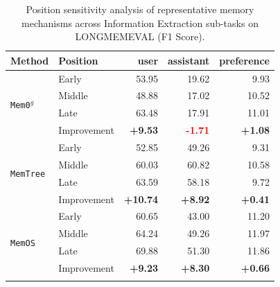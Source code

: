 


\begin{table}[t]
\centering
\caption{Position sensitivity analysis of representative memory mechanisms across Information Extraction sub-tasks on LONGMEMEVAL (F1 Score).}
\small
\begin{tabular}{llrrr}
\toprule

{\textbf{Method}} & {\textbf{Position}} & \textbf{user} & \textbf{assistant} & \textbf{preference} \\
\midrule

\multicolumn{1}{l}{\multirow{4}{*}{\tt Mem0$^g$}} & Early & 53.95 & 19.62 & 9.93\\
& Middle &48.88 & 17.02 & 10.52\\
& Late & 63.48 & 17.91 & 11.01 \\
\cline{2-5}
& Improvement & \textbf{\textcolor{green!60!black}{+9.53}} & \textbf{\textcolor{red}{-1.71}} & \textbf{\textcolor{green!60!black}{+1.08}} \\
\midrule

\multicolumn{1}{l}{\multirow{4}{*}{\tt MemTree}} & Early & 52.85 & 49.26 & 9.31 \\
& Middle & 60.03 & 60.82 & 10.58 \\
& Late & 63.59 & 58.18 & 9.72 \\
\cline{2-5}
& Improvement & \textbf{\textcolor{green!60!black}{+10.74}} & \textbf{\textcolor{green!60!black}{+8.92}} & \textbf{\textcolor{green!60!black}{+0.41}} \\
\midrule

\multicolumn{1}{l}{\multirow{4}{*}{\tt MemOS}} & Early & 60.65 & 43.00 & 11.20 \\
& Middle & 64.24 & 49.26 & 11.97 \\
& Late & 69.88 & 51.30 & 11.86 \\
\cline{2-5}
& Improvement & \textbf{\textcolor{green!60!black}{+9.23}} & \textbf{\textcolor{green!60!black}{+8.30}} & \textbf{\textcolor{green!60!black}{+0.66}} \\
\bottomrule

\label{tab:pos_IE}
\end{tabular}
\end{table}

